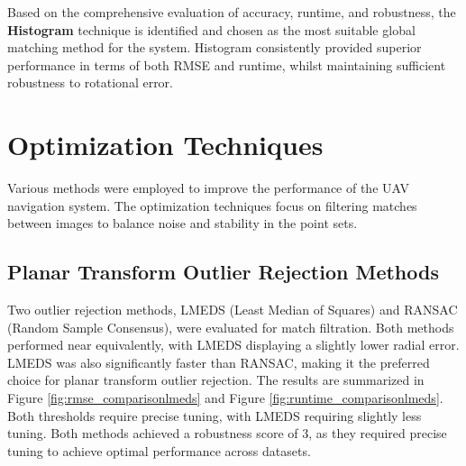 Based on the comprehensive evaluation of accuracy, runtime, and robustness, the \textbf{Histogram} technique is identified and chosen as the most suitable global matching method for the system. Histogram consistently provided superior performance in terms of both RMSE and runtime, whilst maintaining sufficient robustness to rotational error. 




\section{Optimization Techniques}
Various methods were employed to improve the performance of the UAV navigation system. The optimization techniques focus on filtering matches between images to balance noise and stability in the point sets. 


\subsection{Planar Transform Outlier Rejection Methods}

Two outlier rejection methods, LMEDS (Least Median of Squares) and RANSAC (Random Sample Consensus), were evaluated for match filtration. Both methods performed near equivalently, with LMEDS displaying a slightly lower radial error. LMEDS was also significantly faster than RANSAC, making it the preferred choice for planar transform outlier rejection. The results are summarized in Figure \ref{fig:rmse_comparisonlmeds} and Figure \ref{fig:runtime_comparisonlmeds}. Both thresholds require precise tuning, with LMEDS requiring slightly less tuning. Both methods achieved a robustness score of 3, as they required precise tuning to achieve optimal performance across datasets.

